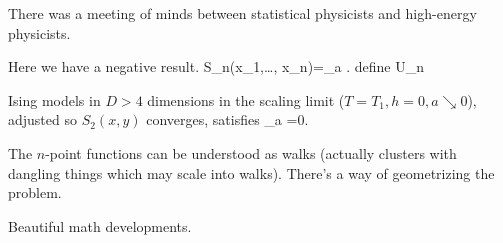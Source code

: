 There was a meeting of minds between statistical physicists and high-energy physicists.

Here we have a negative result.
\be
S_n(x_1,\ldots, x_n)=\lim_{a}  \left{}\right\rangle.
\ee
define
\be
U_n 
\ee

\begin{theorem}
Ising models in $D>4$ dimensions in the scaling limit ($T=T_1,h=0, a\searrow 0$), adjusted so $S_2(x,y)$ converges, satisfies 
\be
\lim_{a}
=0.
\ee
\end{theorem}


The $n$-point functions can be understood as walks (actually clusters with dangling things which may scale into walks). There's a way of geometrizing the problem. 

Beautiful math developments.


%

